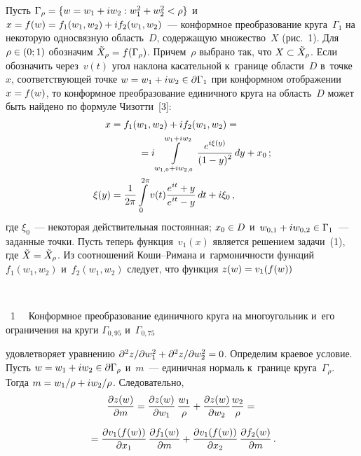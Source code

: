 \begin{multicols}{2}
  Пусть $\Gamma_\rho \hm= \{w=w_1\hm+ iw_2: w_1^2\hm+ w_2^2\hm<\rho\}$ 
  и~$x\hm= f(w)\hm= f_1(w_1, w_2)\hm+ if_2(w_1, w_2)$~--- конформное 
преобразование круга~$\Gamma_1$ на некоторую односвязную область~$D$, 
содержащую множество~$X$ (рис.~1). Для $\rho \hm\in (0;1)$  обозначим 
$\tilde{X}_\rho \hm= f(\Gamma_\rho)$. Причем~$\rho$ выбрано так, что 
$X\hm\subset \tilde{X}_\rho$. Если обозначить через~$v(t)$ угол наклона 
касательной к~границе области~$D$ в~точке~$x$, соответствующей точке $w\hm= 
w_1\hm+ iw_2\hm\in \partial \Gamma_1$ при конформном отоб\-ра\-же\-нии $x\hm= 
f(w)$, то конформное преобразование единичного круга на об\-ласть~$D$ может 
быть найдено по формуле Чизотти~[3]:
  \begin{align*}
  x&=f_1(w_1,w_2) +if_2(w_1,w_2)={}\\
 & \hspace*{10mm}{}=i\int\limits_{w_{1,0}+iw_{2,0}}^{w_1+iw_2} 
\fr{e^{i\xi(y)}}{(1-y)^2}\,dy +x_0\,;\\
  \xi(y)&=\fr{1}{2\pi} \int\limits_0^{2\pi} v(t) \fr{e^{it}+y}{e^{it}-y}\,dt+i\xi_0\,,
  \end{align*}
где $\xi_0$~--- некоторая действительная по\-сто\-ян\-ная; $x_0\hm\in D$ 
и~$w_{0,1}\hm+ i w_{0,2}\hm\in \Gamma_1$~--- заданные точки. Пусть теперь 
функция~$v_1(x)$ является решением задачи~(1), где $\tilde{X}\hm= 
\tilde{X}_\rho$. Из соотношений Ко\-ши--Ри\-ма\-на и~гармоничности функций 
$f_1(w_1, w_2)$ и~$f_2(w_1, w_2)$ следует, что функция $z(w)\hm= v_1(f(w))$\linebreak\vspace*{-12pt}

{ \begin{center}  %
 \vspace*{-6pt}
    \mbox{%
\epsfxsize=79mm
}

\end{center}

\vspace*{-3pt}

\noindent
{{\figurename~1}\ \ \small{
Конформное преобразование единичного круга на многоугольник и~его ограничения 
на круги $\Gamma_{0{,}95}$ и~$\Gamma_{0{,}75}$ 
}}}

\vspace*{18pt}

\setcounter{figure}{1}


\noindent 
удовле\-тво\-ря\-ет уравнению $\partial^2 z/\partial w_1^2\hm+ \partial^2 z/\partial 
w_2^2\hm=0$.
 Определим краевое условие. Пусть $w\hm= w_1\hm+ iw_2\hm\in 
\partial \Gamma_\rho$  и~$m$~--- единичная нормаль к~границе 
круга~$\Gamma_\rho$. Тогда $m\hm= w_1/\rho \hm+ iw_2/\rho$. Следовательно,
\begin{multline*}
\displaystyle\frac{\displaystyle \partial z(w)\mathstrut}{\displaystyle \partial m\mathstrut}=\displaystyle\frac{\displaystyle \partial z(w)\mathstrut}{\displaystyle \partial w_1\mathstrut}\,\displaystyle\frac{\displaystyle w_1\mathstrut}{\displaystyle \rho\mathstrut} 
+\displaystyle\frac{\displaystyle \partial z(w)\mathstrut}{\displaystyle \partial w_2\mathstrut}\displaystyle\frac{\displaystyle w_2\mathstrut}{\displaystyle \rho\mathstrut}={}\\[6pt]
{}=\displaystyle\frac{\displaystyle \partial v_1(f(w))\mathstrut}{\displaystyle \partial x_1\mathstrut}\,\displaystyle\frac{\displaystyle \partial f_1(w)\mathstrut}{\displaystyle \partial m\mathstrut}+\displaystyle\frac{\displaystyle \partial 
v_1(f(w))\mathstrut}{\displaystyle \partial x_2\mathstrut}\,\displaystyle\frac{\displaystyle \partial f_2(w)\mathstrut}{\displaystyle \partial m\mathstrut}\,.
\end{multline*}
  

\end{multicols}
